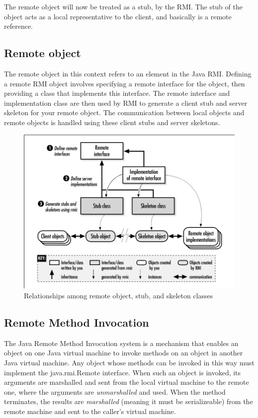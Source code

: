 The remote object will now be treated as a stub, by the RMI. The stub of the object acts as a local representative to the client, and basically is a remote reference.


\subsection{Remote object}
The remote object in this context refers to an element in the Java RMI. Defining a remote RMI object involves specifying a remote interface for the object, then providing a class that implements this interface. The remote interface and implementation class are then used by RMI to generate a client stub and server skeleton for your remote object. The communication between local objects and remote objects is handled using these client stubs and server skeletons.

\begin{figure}[ht!]
\centering
\includegraphics[width=150mm]{img/remote_object_relationship.png}
\caption{ Relationships among remote object, stub, and skeleton classes}
\label{Remote Object relationship}
\end{figure}

\subsection{Remote Method Invocation}
The Java Remote Method Invocation system is a mechanism that enables an object on one Java virtual machine to invoke methods on an object in another Java virtual machine. Any object whose methods can be invoked in this way must implement the java.rmi.Remote interface. When such an object is invoked, its arguments are marshalled and sent from the local virtual machine to the remote one, where the arguments are \emph{unmarshalled} and used. When the method terminates, the results are \emph{marshalled} (meaning it must be serializeable) from the remote machine and sent to the caller's virtual machine.

